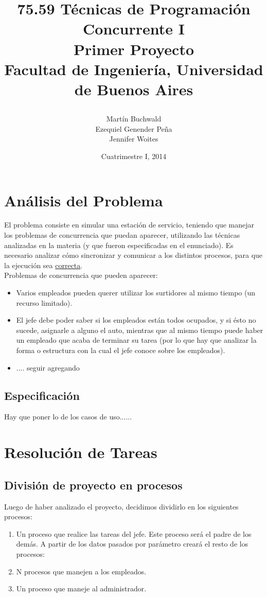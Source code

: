 \documentclass[a4paper,12pt]{article}
\author{Martín Buchwald \\ Ezequiel Genender Peña \\ Jennifer Woites}
\title{75.59 Técnicas de Programación Concurrente I\\
	\textbf{Primer Proyecto}\\
	Facultad de Ingeniería, Universidad de Buenos Aires
	\date{Cuatrimestre I, 2014}
}
\begin{document}
\maketitle
\thispagestyle{empty}
\newpage
\tableofcontents
\newpage

\section{Análisis del Problema}
El problema consiste en simular una estación de servicio, teniendo que manejar los problemas de concurrencia que puedan aparecer, utilizando las técnicas analizadas en la materia (y que fueron especificadas en el enunciado). Es necesario analizar cómo sincronizar y comunicar a los distintos procesos, para que la ejecución sea \underline{correcta}.\\
Problemas de concurrencia que pueden aparecer:
\begin{itemize}
\item Varios empleados pueden querer utilizar los surtidores al mismo tiempo (un recurso limitado).
\item El jefe debe poder saber si los empleados están todos ocupados, y si ésto no sucede, asignarle a alguno el auto, mientras que al mismo tiempo puede haber un empleado que acaba de terminar su tarea (por lo que hay que analizar la forma o estructura con la cual el jefe conoce sobre los empleados).
\item .... seguir agregando
\end{itemize}

\subsection{Especificación}
Hay que poner lo de los casos de uso...... 

\section{Resolución de Tareas}
\subsection{División de proyecto en procesos}
Luego de haber analizado el proyecto, decidimos dividirlo en los siguientes procesos:
\begin{enumerate}
\item Un proceso que realice las tareas del jefe. Este proceso será el padre de los demás. A partir de los datos pasados por parámetro creará el resto de los procesos:
\item N procesos que manejen a los empleados.
\item Un proceso que maneje al administrador.
\end{enumerate}
\end{document}
